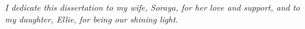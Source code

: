 
\begin{center}
\vspace*{52pt}
\textit{I dedicate this dissertation to my wife, Soraya, for  her love and support, and to my daughter, Ellie, for being our shining light.}
\end{center}

\pagebreak
